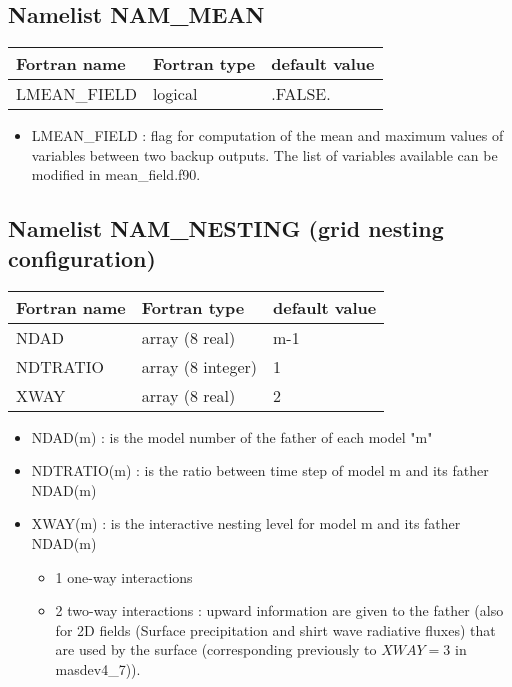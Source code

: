 \subsection{Namelist NAM\_MEAN}
\begin{center}
\begin{tabular} {|l|l|l|}
\hline
Fortran name & Fortran type & default value \\
\hline
LMEAN\_FIELD  &  logical &  .FALSE. \\
\hline
\end{tabular}
\end{center}
\begin{itemize}
 \item LMEAN\_FIELD : flag for computation of the mean and maximum values of variables between two backup outputs. The list of variables available can be modified in mean\_field.f90.
\end{itemize}

\subsection{Namelist NAM\_NESTING (grid nesting configuration)}

\begin{center}
\begin{tabular} {|l|l|l|}
\hline
Fortran name & Fortran type & default value \\
\hline
NDAD  &  array (8 real) &  m-1   \\
NDTRATIO & array (8 integer) & 1 \\
XWAY & array (8 real) & 2 \\
\hline
\end{tabular}
\end{center}

\begin{itemize}
\item
{}  
NDAD(m) : is the model number of the father of each model "m"
\item
{}
NDTRATIO(m) : is the ratio between time step of model m and its father NDAD(m)
\item
{} 
XWAY(m) : is the interactive nesting level for model m and its father NDAD(m)
\begin{itemize}
\item 1 one-way interactions
\item 2 two-way interactions : upward information are given to the father (also for 2D fields (Surface precipitation and
shirt wave radiative fluxes) that are used by the surface (corresponding previously to $XWAY=3$ in masdev4\_7)). 
\end{itemize}
\end{itemize}
